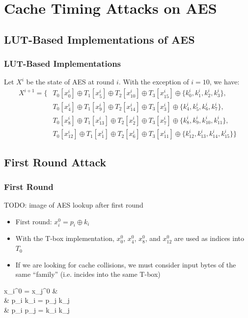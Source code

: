 \documentclass[8pt,handout]{beamer}
\begin{document}
\section{Cache Timing Attacks on AES}
\subsection{LUT-Based Implementations of AES}
\begin{frame}
	\frametitle{LUT-Based Implementations}
	Let $X^i$ be the state of AES at round $i$. With the exception of $i = 10$, we have:
\begin{align*}
X^{i+1} = \{ & T_0[x_0^i] \oplus T_1[x_5^i] \oplus T_2[x_{10}^i] \oplus T_3[x_{15}^i] \oplus \{k_0^i, k_1^i, k_2^i, k_3^i\}, \\
& T_0[x_4^i] \oplus T_1[x_{9}^i] \oplus T_2[x_{14}^i] \oplus T_3[x_3^i] \oplus \{k_4^i, k_5^i, k_6^i, k_7^i\}, \\
& T_0[x_8^i] \oplus T_1[x_{13}^i] \oplus T_2[x_2^i] \oplus T_3[x_7^i] \oplus \{k_8^i, k_9^i, k_{10}^i, k_{11}^i\}, \\
& T_0[x_{12}^i] \oplus T_1[x_1^i] \oplus T_2[x_6^i] \oplus T_3[x_{11}^i] \oplus \{k_{12}^i, k_{13}^i, k_{14}^i, k_{15}^i\}\}
\end{align*}
\end{frame}

\subsection{First Round Attack}
\begin{frame}
	\frametitle{First Round}
	TODO: image of AES lookup after first round
	\begin{itemize}
		\item First round: $x_i^{0} = p_i \oplus k_i$
		\item With the T-box implementation, $x_0^0$, $x_4^0$, $x_8^0$, and $x_{12}^0$ are 
		used as indices into $T_0$
		\item If we are looking for cache collisions, we must consider input bytes of the same ``family'' 
		(i.e. incides into the same T-box)
	\end{itemize}
	\begin{center}
		\langle x_i^0 \rangle = \langle x_j^0 \rangle & \Rightarrow \\
		& \langle p_i \rangle \oplus \langle k_i \rangle = \langle p_j \rangle \oplus \langle k_j \rangle \Rightarrow \\
		& \langle p_i \rangle \oplus \langle p_j \rangle = \langle k_i \rangle \oplus \langle k_j \rangle \Rightarrow
	\end{center}
\end{frame}
\end{document}
